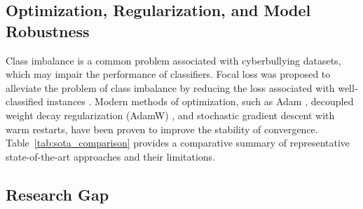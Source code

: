 \subsection{Optimization, Regularization, and Model Robustness}

Class imbalance is a common problem associated with cyberbullying datasets, which may impair the performance of classifiers. Focal loss was proposed to alleviate the problem of class imbalance by reducing the loss associated with well-classified instances \cite{ref23}. Modern methods of optimization, such as Adam \cite{ref24}, decoupled weight decay regularization (AdamW) \cite{ref25}, and stochastic gradient descent with warm restarts, have been proven to improve the stability of convergence. Table~\ref{tab:sota_comparison} provides a comparative summary of representative state-of-the-art approaches and their limitations.

\begin{table}[!t]
\caption{Comparative Summary of State-of-the-Art Cyberbullying Detection Approaches}
\label{tab:sota_comparison}
\centering
{}
\end{table}

\subsection{Research Gap}

